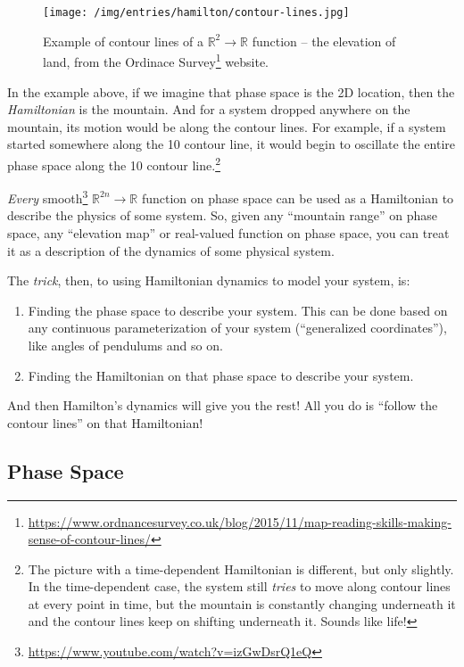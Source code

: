 \documentclass[]{article}
\renewcommand{\href}[2]{#2\footnote{\url{#1}}}
\begin{document}
\begin{figure}
\centering
\texttt{[image: /img/entries/hamilton/contour-lines.jpg]}
\caption{Example of contour lines of a \(\mathbb{R}^2 \rightarrow \mathbb{R}\)
function -- the elevation of land, from the
\href{https://www.ordnancesurvey.co.uk/blog/2015/11/map-reading-skills-making-sense-of-contour-lines/}{Ordinace
Survey} website.}
\end{figure}

In the example above, if we imagine that phase space is the 2D location, then
the \emph{Hamiltonian} is the mountain. And for a system dropped anywhere on the
mountain, its motion would be along the contour lines. For example, if a system
started somewhere along the 10 contour line, it would begin to oscillate the
entire phase space along the 10 contour line.\footnote{The picture with a
  time-dependent Hamiltonian is different, but only slightly. In the
  time-dependent case, the system still \emph{tries} to move along contour lines
  at every point in time, but the mountain is constantly changing underneath it
  and the contour lines keep on shifting underneath it. Sounds like life!}

\emph{Every} \href{https://www.youtube.com/watch?v=izGwDsrQ1eQ}{smooth}
\(\mathbb{R}^{2n} \rightarrow \mathbb{R}\) function on phase space can be used
as a Hamiltonian to describe the physics of some system. So, given any
``mountain range'' on phase space, any ``elevation map'' or real-valued function
on phase space, you can treat it as a description of the dynamics of some
physical system.

The \emph{trick}, then, to using Hamiltonian dynamics to model your system, is:

\begin{enumerate}
\def\labelenumi{\arabic{enumi}.}
\item
  Finding the phase space to describe your system. This can be done based on any
  continuous parameterization of your system (``generalized coordinates''), like
  angles of pendulums and so on.
\item
  Finding the Hamiltonian on that phase space to describe your system.
\end{enumerate}

And then Hamilton's dynamics will give you the rest! All you do is ``follow the
contour lines'' on that Hamiltonian!

\hypertarget{phase-space}{%
\subsection{Phase Space}\label{phase-space}}
\end{document}
